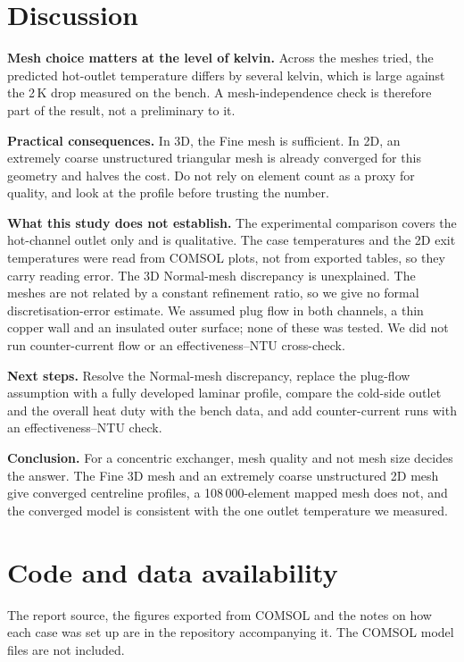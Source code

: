 \documentclass[11pt,letterpaper]{article}
\begin{document}
\section{Discussion}\label{sec:discussion}
\textbf{Mesh choice matters at the level of kelvin.} Across the meshes tried, the predicted hot-outlet temperature differs by several kelvin, which is large against the 2\,K drop measured on the bench. A mesh-independence check is therefore part of the result, not a preliminary to it.

\textbf{Practical consequences.} In 3D, the Fine mesh is sufficient. In 2D, an extremely coarse unstructured triangular mesh is already converged for this geometry and halves the cost. Do not rely on element count as a proxy for quality, and look at the profile before trusting the number.

\textbf{What this study does not establish.} The experimental comparison covers the hot-channel outlet only and is qualitative. The case temperatures and the 2D exit temperatures were read from COMSOL plots, not from exported tables, so they carry reading error. The 3D Normal-mesh discrepancy is unexplained. The meshes are not related by a constant refinement ratio, so we give no formal discretisation-error estimate. We assumed plug flow in both channels, a thin copper wall and an insulated outer surface; none of these was tested. We did not run counter-current flow or an effectiveness--NTU cross-check.

\textbf{Next steps.} Resolve the Normal-mesh discrepancy, replace the plug-flow assumption with a fully developed laminar profile, compare the cold-side outlet and the overall heat duty with the bench data, and add counter-current runs with an effectiveness--NTU check.

\textbf{Conclusion.} For a concentric exchanger, mesh quality and not mesh size decides the answer. The Fine 3D mesh and an extremely coarse unstructured 2D mesh give converged centreline profiles, a 108\,000-element mapped mesh does not, and the converged model is consistent with the one outlet temperature we measured.

\section*{Code and data availability}
The report source, the figures exported from COMSOL and the notes on how each case was set up are in the repository accompanying it. The COMSOL model files are not included.
\end{document}
